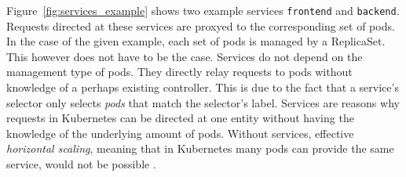 Figure~\ref{fig:services_example} shows two example services \texttt{frontend}
and \texttt{backend}. Requests directed at these services are proxyed to the
corresponding set of pods. In the case of the given example, each set of pods
is managed by a ReplicaSet. This however does not have to be the case. Services
do not depend on the management type of pods. They directly relay requests to
pods without knowledge of a perhaps existing controller. This is due to the
fact that a service's selector only selects \textit{pods} that match the
selector's label. Services are reasons why requests in Kubernetes can be
directed at one entity without having the knowledge of the underlying amount of
pods. Without services, effective \textit{horizontal scaling}, meaning that in
Kubernetes many pods can provide the same service, would not be possible
\autocite[Ch. 5]{LuksaKubernetesAction2017}.
